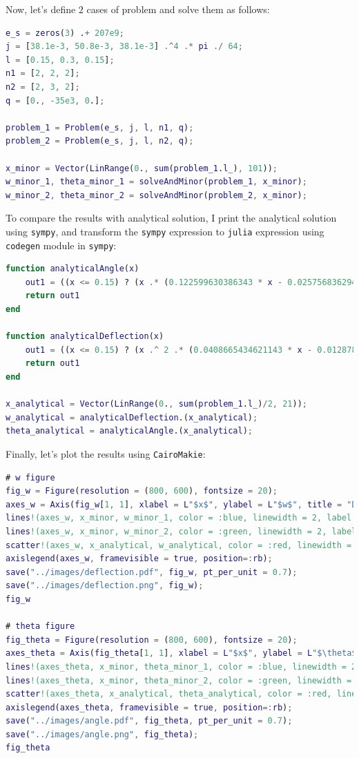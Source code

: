 Now, let's define $2$ cases of problem and solve them as follows:
\begin{lstlisting}[language=matlab]
e_s = zeros(3) .+ 207e9;
j = [38.1e-3, 50.8e-3, 38.1e-3] .^4 .* pi ./ 64;
l = [0.15, 0.3, 0.15];
n1 = [2, 2, 2];
n2 = [2, 3, 2];
q = [0., -35e3, 0.];

problem_1 = Problem(e_s, j, l, n1, q);
problem_2 = Problem(e_s, j, l, n2, q);

x_minor = Vector(LinRange(0., sum(problem_1.l_), 101));
w_minor_1, theta_minor_1 = solveAndMinor(problem_1, x_minor);
w_minor_2, theta_minor_2 = solveAndMinor(problem_2, x_minor);
\end{lstlisting}

To compare the results with analytical solution,
I print the analytical solution using \verb|sympy|,
and transform the \verb|sympy| expression to \verb|julia| expression using 
\verb|codegen| module in \verb|sympy|:
\begin{lstlisting}[language=matlab]
function analyticalAngle(x)
    out1 = ((x <= 0.15) ? (x .* (0.122599630386343 * x - 0.0257568362948163)) : (-0.0862028651153974 * x .^ 3 + 0.0775825786038577 * x .^ 2 - 0.013968317379196 * x - 0.000464459502472649))
    return out1
end

function analyticalDeflection(x)
    out1 = ((x <= 0.15) ? (x .^ 2 .* (0.0408665434621143 * x - 0.0128784181474081)) : (-0.0215507162788494 * x .^ 4 + 0.0258608595346192 * x .^ 3 - 0.00698415868959802 * x .^ 2 - 0.000464459502472649 * x - 1.39767905836677e-6))
    return out1
end

x_analytical = Vector(LinRange(0., sum(problem_1.l_)/2, 21));
w_analytical = analyticalDeflection.(x_analytical);
theta_analytical = analyticalAngle.(x_analytical);
\end{lstlisting}

Finally, let's plot the results using \verb|CairoMakie|:
\begin{lstlisting}[language=matlab]
# w figure
fig_w = Figure(resolution = (800, 600), fontsize = 20);
axes_w = Axis(fig_w[1, 1], xlabel = L"$x$", ylabel = L"$w$", title = "Deflection");
lines!(axes_w, x_minor, w_minor_1, color = :blue, linewidth = 2, label = L"$n_2=2$");
lines!(axes_w, x_minor, w_minor_2, color = :green, linewidth = 2, label = L"$n_2=3$");
scatter!(axes_w, x_analytical, w_analytical, color = :red, linewidth = 2, label = "Analytical");
axislegend(axes_w, framevisible = true, position=:rb);
save("../images/deflection.pdf", fig_w, pt_per_unit = 0.7);
save("../images/deflection.png", fig_w);
fig_w
    
# theta figure
fig_theta = Figure(resolution = (800, 600), fontsize = 20);
axes_theta = Axis(fig_theta[1, 1], xlabel = L"$x$", ylabel = L"$\theta$", title = "Angle");
lines!(axes_theta, x_minor, theta_minor_1, color = :blue, linewidth = 2, label = L"$n_2=2$");
lines!(axes_theta, x_minor, theta_minor_2, color = :green, linewidth = 2, label = L"$n_2=3$");
scatter!(axes_theta, x_analytical, theta_analytical, color = :red, linewidth = 2, label = "Analytical");
axislegend(axes_theta, framevisible = true, position=:rb);
save("../images/angle.pdf", fig_theta, pt_per_unit = 0.7);
save("../images/angle.png", fig_theta);
fig_theta
\end{lstlisting}


